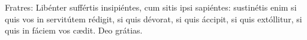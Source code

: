 Fratres: Libénter suffértis insipiéntes, cum sitis ipsi sapiéntes: sustinétis enim si quis vos in servitútem rédigit, si quis dévorat, si quis áccipit, si quis extóllitur, si quis in fáciem vos cædit. \rubric{\Rbar} Deo grátias.
